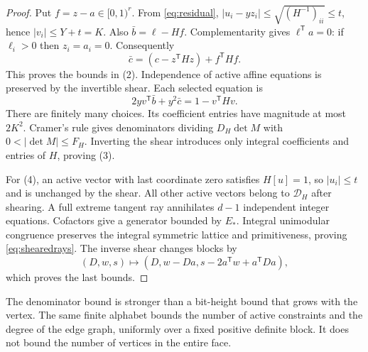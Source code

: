 \documentclass[11pt]{article}
\theoremstyle{definition}\newtheorem{definition}[theorem]{Definition}
\theoremstyle{remark}\newtheorem{remark}[theorem]{Remark}
\newcommand{\T}{^{\mathsf T}}\newcommand{\norm}[1]{\lVert #1\rVert}
\begin{document}
\begin{proof}
Put $f=z-a\in[0,1)^r$. From \eqref{eq:residual}, $|u_i-yz_i|\le\sqrt{(H^{-1})_{ii}}\le t$, hence $|v_i|\le Y+t=K$. Also $\bar b=\ell-Hf$. Complementarity gives $\ell\T a=0$: if $\ell_i>0$ then $z_i=a_i=0$. Consequently
\[
 \bar c=(c-z\T Hz)+f\T Hf.
\]
This proves the bounds in (2). Independence of active affine equations is preserved by the invertible shear. Each selected equation is
\[
 2yv\T\bar b+y^2\bar c=1-v\T Hv.
\]
There are finitely many choices. Its coefficient entries have magnitude at most $2K^2$. Cramer's rule gives denominators dividing $D_H\det M$ with $0<|\det M|\le F_H$. Inverting the shear introduces only integral coefficients and entries of $H$, proving (3).

For (4), an active vector with last coordinate zero satisfies $H[u]=1$, so $|u_i|\le t$ and is unchanged by the shear. All other active vectors belong to $\mathcal D_H$ after shearing. A full extreme tangent ray annihilates $d-1$ independent integer equations. Cofactors give a generator bounded by $E_*$. Integral unimodular congruence preserves the integral symmetric lattice and primitiveness, proving \eqref{eq:shearedrays}. The inverse shear changes blocks by
\[
 (D,w,s)\longmapsto(D,w-Da,s-2a\T w+a\T Da),
\]
which proves the last bounds.
\end{proof}

The denominator bound is stronger than a bit-height bound that grows with the vertex. The same finite alphabet bounds the number of active constraints and the degree of the edge graph, uniformly over a fixed positive definite block. It does not bound the number of vertices in the entire face.
\end{document}
